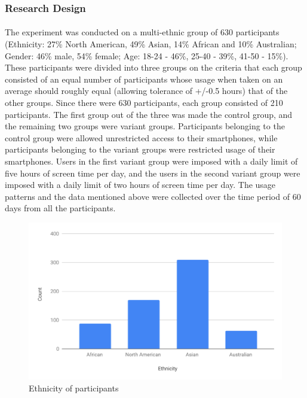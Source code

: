 \documentclass{article}
\begin{document}
\subsubsection{Research Design}

\paragraph{} The experiment was conducted on a multi-ethnic group of 630 participants (Ethnicity: 27\% North American, 49\% Asian, 14\% African and 10\% Australian; Gender: 46\% male, 54\% female; Age: 18-24 - 46\%, 25-40 - 39\%, 41-50 - 15\%). These participants were divided into three groups on the criteria that each group consisted of an equal number of participants whose usage when taken on an average should roughly equal (allowing tolerance of +/-0.5 hours) that of the other groups. Since there were 630 participants, each group consisted of 210 participants. The first group out of the three was made the control group, and the remaining two groups were variant groups. Participants belonging to the control group were allowed unrestricted access to their smartphones, while participants belonging to the variant groups were restricted usage of their smartphones. Users in the first variant group were imposed with a daily limit of five hours of screen time per day, and the users in the second variant group were imposed with a daily limit of two hours of screen time per day. The usage patterns and the data mentioned above were collected over the time period of 60 days from all the participants.


\begin{figure}[hbtp]
    \centering
    \includegraphics[width=\textwidth]{p-e.pdf}
    \caption{Ethnicity of participants}
    \label{fig:figone}
\end{figure}
\end{document}
